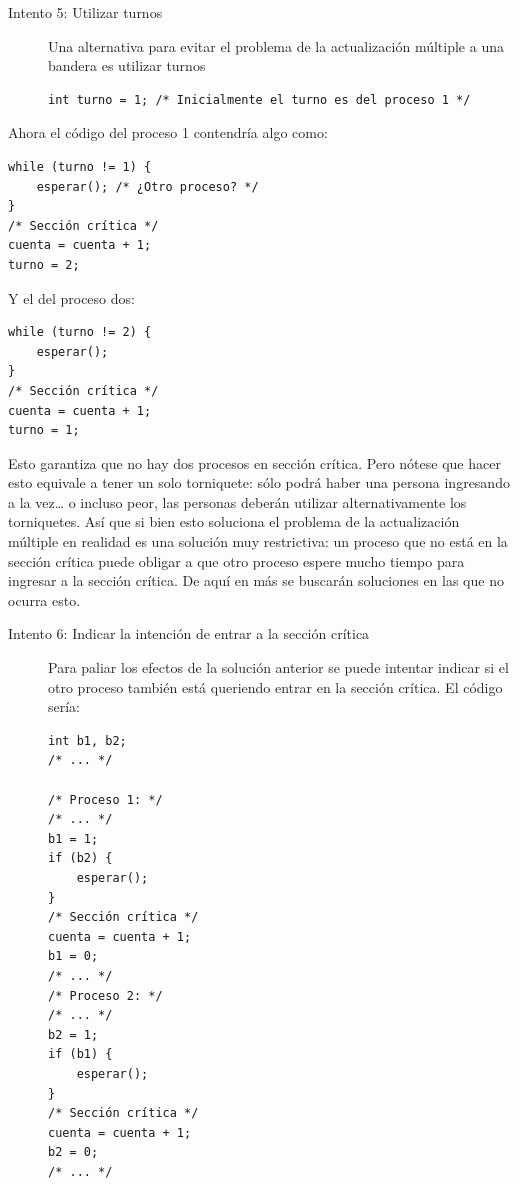 \documentclass[11pt,fleqn]{book} %
\begin{document}
\begin{description}
\item[Intento 5: Utilizar turnos] Una alternativa para evitar el problema de la actualización múltiple a
  una bandera es utilizar turnos


\begin{verbatim}
int turno = 1; /* Inicialmente el turno es del proceso 1 */
\end{verbatim}
\end{description}
  Ahora el código del proceso 1 contendría algo como:


\begin{verbatim}
while (turno != 1) {
    esperar(); /* ¿Otro proceso? */
}
/* Sección crítica */
cuenta = cuenta + 1;
turno = 2;
\end{verbatim}

  Y el del proceso dos:


\begin{verbatim}
while (turno != 2) {
    esperar();
}
/* Sección crítica */
cuenta = cuenta + 1;
turno = 1;
\end{verbatim}

  Esto garantiza que no hay dos procesos en sección crítica. Pero nótese
  que hacer esto equivale a tener un solo torniquete: sólo podrá haber
  una persona ingresando a la vez\ldots{} o incluso peor, las personas
  deberán utilizar alternativamente los torniquetes. Así que si bien
  esto soluciona el problema de la actualización múltiple en realidad es
  una solución muy restrictiva: un proceso que no está en la sección
  crítica puede obligar a que otro proceso espere mucho tiempo para
  ingresar a la sección crítica. De aquí en más se buscarán soluciones en
  las que no ocurra esto.

\begin{description}
\item[Intento 6: Indicar la intención de entrar a la sección crítica] Para paliar los efectos de la solución anterior se puede intentar
  indicar si el otro proceso también está queriendo entrar en la sección
  crítica. El código sería:


\begin{verbatim}
int b1, b2;
/* ... */

/* Proceso 1: */
/* ... */
b1 = 1;
if (b2) {
    esperar();
}
/* Sección crítica */
cuenta = cuenta + 1;
b1 = 0;
/* ... */
/* Proceso 2: */
/* ... */
b2 = 1;
if (b1) {
    esperar();
}
/* Sección crítica */
cuenta = cuenta + 1;
b2 = 0;
/* ... */
\end{verbatim}
\end{description}
\end{document}
